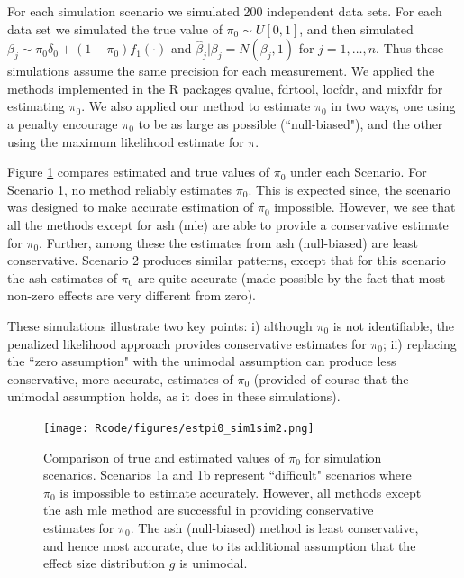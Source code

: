 \documentclass[11pt]{article}
\begin{document}
For each simulation scenario we simulated 200 independent data sets. For each data set we simulated
the true value of $\pi_0  \sim U[0,1]$, and then simulated $\beta_j \sim \pi_0 \delta_0 + (1-\pi_0) f_1(\cdot)$
and $\hat\beta_j | \beta_j = N(\beta_j,1)$ for $j=1,\dots,n$. Thus these simulations assume the same
precision for each measurement. We applied the methods implemented in the R packages qvalue, fdrtool, locfdr, and mixfdr
for estimating $\pi_0$. We also applied our method to estimate $\pi_0$ in two ways, one using a penalty encourage
$\pi_0$ to be as large as possible (``null-biased"), and the other using the maximum likelihood estimate for $\pi$.


Figure \ref{fig:pi0} compares estimated and true values of $\pi_0$ under each Scenario. 
For Scenario 1, no method reliably estimates $\pi_0$. This is expected since, the scenario was designed to make accurate estimation
of $\pi_0$ impossible. However, we see that all the methods except for ash (mle) are able to provide a conservative
estimate for $\pi_0$. Further, among these the estimates from ash (null-biased) are least conservative. Scenario 2 produces similar patterns,
except that for this scenario the ash estimates of $\pi_0$ are quite accurate (made possible by the fact that most non-zero effects
are very different from zero).

These simulations illustrate two key points: i) although $\pi_0$ is not identifiable, the penalized likelihood approach
provides conservative estimates for $\pi_0$; ii) replacing the ``zero assumption" with the unimodal assumption can produce
less conservative, more accurate, estimates of $\pi_0$ (provided of course that the unimodal assumption holds, as it does in these simulations).

\begin{figure}[!ht] \label{fig:pi0}
\begin{center}
\texttt{[image: Rcode/figures/estpi0\_sim1sim2.png]}
\end{center}
\caption{Comparison of true and estimated values of $\pi_0$ for simulation scenarios. Scenarios 1a and 1b represent ``difficult" scenarios where $\pi_0$ is impossible to estimate accurately. However, all methods except the ash mle method are successful in providing conservative estimates for $\pi_0$. The ash (null-biased) method is least conservative, and hence most accurate, due to its additional assumption that the effect size distribution $g$ is unimodal.}
\end{figure}
\end{document}
